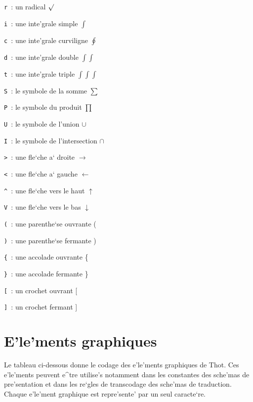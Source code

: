 {\begin{description}
\item{ {\tt r }}: un radical $\surd$
\item{ {\tt i }}: une inte'grale simple $\int$
\item{ {\tt c }}: une inte'grale curviligne $\oint$
\item{ {\tt d }}: une inte'grale double $\int\int$
\item{ {\tt t }}: une inte'grale triple $\int\int\int$
\item{ {\tt S }}: le symbole de la somme $\sum$
\item{ {\tt P }}: le symbole du produit $\prod$
\item{ {\tt U }}: le symbole de l'union $\cup$
\item{ {\tt I }}: le symbole de l'intersection $\cap$
\item{ {\tt > }}: une fle`che a` droite $\rightarrow$
\item{ {\tt < }}: une fle`che a` gauche $\leftarrow$
\item{ {\tt \^{ } }}:  une fle`che vers le haut $\uparrow$
\item{ {\tt V }}: une fle`che vers le bas $\downarrow$
\item{ {\tt ( }}: une parenthe`se ouvrante (
\item{ {\tt ) }}: une parenthe`se fermante )
\item{ {\tt \{ }}: une accolade ouvrante \{
\item{ {\tt \} }}: une accolade fermante \}
\item{ {\tt [ }}: un crochet ouvrant [
\item{ {\tt ] }}: un crochet fermant ]
\end{description}

\section{E'le'ments graphiques}

Le tableau ci-dessous donne le codage des e'le'ments graphiques de Thot. Ces
e'le'ments peuvent e^tre utilise's notamment dans les constantes des sche'mas
de pre'sentation et dans les re`gles de transcodage des sche'mas de
traduction. Chaque e'le'ment graphique est repre'sente' par un seul
caracte`re.

}
